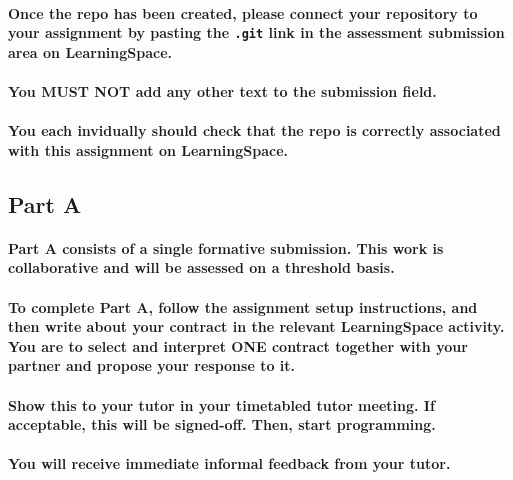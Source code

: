 \documentclass{../../fal_assignment}
\begin{document}
\paragraph{Once the repo has been created, please connect your repository to your assignment by pasting the \texttt{.git} link in the assessment submission area on LearningSpace.}

\paragraph{You \textbf{MUST NOT} add any other text to the submission field.}

\paragraph{You each invidually should check that the repo is correctly associated with this assignment on LearningSpace.}

\subsection*{Part A}

\paragraph{Part A consists of a \textbf{single formative submission}. This work is \textbf{collaborative} and will be assessed on a \textbf{threshold} basis.}

\paragraph{To complete Part A, follow the assignment setup instructions, and then write about your contract in the relevant LearningSpace activity. You are to select and interpret \textbf{ONE} contract together with your partner and propose your response to it.}

\paragraph{Show this to your tutor in your timetabled tutor meeting. If acceptable, this will be signed-off. Then, start programming.}

\paragraph{You will receive immediate \textbf{informal feedback} from your \textbf{tutor}.}
\end{document}
